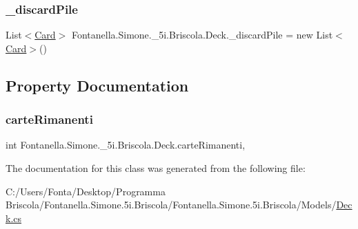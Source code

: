 \hypertarget{class_fontanella_1_1_simone_1_1__5i_1_1_briscola_1_1_deck_a065f7dd81106ac0d3856034059a02977}{}\label{class_fontanella_1_1_simone_1_1__5i_1_1_briscola_1_1_deck_a065f7dd81106ac0d3856034059a02977} 
\subsubsection{\texorpdfstring{\+\_\+discard\+Pile}{\_discardPile}}
{\footnotesize\ttfamily List$<$\hyperlink{class_fontanella_1_1_simone_1_1__5i_1_1_briscola_1_1_card}{Card}$>$ Fontanella.\+Simone.\+\_\+5i.\+Briscola.\+Deck.\+\_\+discard\+Pile = new List$<$\hyperlink{class_fontanella_1_1_simone_1_1__5i_1_1_briscola_1_1_card}{Card}$>$()}



\subsection{Property Documentation}
\hypertarget{class_fontanella_1_1_simone_1_1__5i_1_1_briscola_1_1_deck_aa18c1840ad50ac7c015b5bcc34c1892f}{}\label{class_fontanella_1_1_simone_1_1__5i_1_1_briscola_1_1_deck_aa18c1840ad50ac7c015b5bcc34c1892f} 
\subsubsection{\texorpdfstring{carte\+Rimanenti}{carteRimanenti}}
{\footnotesize\ttfamily int Fontanella.\+Simone.\+\_\+5i.\+Briscola.\+Deck.\+carte\+Rimanenti\hspace{0.3cm}{\ttfamily [get]}, {\ttfamily [set]}}



The documentation for this class was generated from the following file\+:\begin{DoxyCompactItemize}
\item 
C\+:/\+Users/\+Fonta/\+Desktop/\+Programma Briscola/\+Fontanella.\+Simone.\+5i.\+Briscola/\+Fontanella.\+Simone.\+5i.\+Briscola/\+Models/\hyperlink{_deck_8cs}{Deck.\+cs}\end{DoxyCompactItemize}
